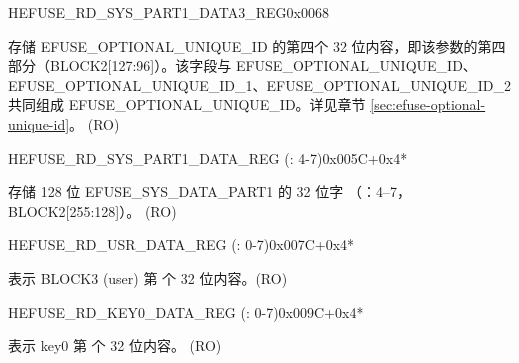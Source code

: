 \begin{register}{H}{EFUSE\_RD\_SYS\_PART1\_DATA3\_REG}{0x0068}\label{regdesc:EFUSERDSYSPART1DATA3REG}
%
\regnewline%
\begin{regdesc}\begin{reglist}
\label{fielddesc:EFUSEOPTIONALUNIQUEID3}\item [EFUSE\_OPTIONAL\_UNIQUE\_ID\_3] 存储 EFUSE\_OPTIONAL\_UNIQUE\_ID 的第四个 32 位内容，即该参数的第四部分（BLOCK2[127:96]）。该字段与 EFUSE\_OPTIONAL\_UNIQUE\_ID、EFUSE\_OPTIONAL\_UNIQUE\_ID\_1、EFUSE\_OPTIONAL\_UNIQUE\_ID\_2 共同组成 EFUSE\_OPTIONAL\_UNIQUE\_ID。详见章节 \ref{sec:efuse-optional-unique-id}。 (RO)
\end{reglist}\end{regdesc}
\end{register}


\begin{register}{H}{EFUSE\_RD\_SYS\_PART1\_DATA\_REG (: 4-7)}{0x005C+0x4*}\label{regdesc:EFUSERDSYSPART1DATA4TO7REG}
%
\regnewline%
\begin{regdesc}\begin{reglist}
\label{fielddesc:EFUSESYSDATAPART1N}\item [EFUSE\_SYS\_DATA\_PART1\_\regindex{n}] 存储 128 位 EFUSE\_SYS\_DATA\_PART1 的 32 位字 （：4–7，BLOCK2[255:128]）。 (RO)
\end{reglist}\end{regdesc}
\end{register}


\begin{register}{H}{EFUSE\_RD\_USR\_DATA\_REG (: 0-7)}{0x007C+0x4*}\label{regdesc:EFUSERDUSRDATANREG}
%
\regnewline%
\begin{regdesc}\begin{reglist}
\label{fielddesc:EFUSEUSRDATAN}\item [EFUSE\_USR\_DATA\regindex{n}] 表示 BLOCK3 (user) 第  个 32 位内容。(RO)
\end{reglist}\end{regdesc}
\end{register}


\begin{register}{H}{EFUSE\_RD\_KEY0\_DATA\_REG (: 0-7)}{0x009C+0x4*}\label{regdesc:EFUSERDKEY0DATANREG}
%
\regnewline%
\begin{regdesc}\begin{reglist}
\label{fielddesc:EFUSEKEY0DATAN}\item [EFUSE\_KEY0\_DATA\regindex{n}] 表示 key0 第  个 32 位内容。 (RO)
\end{reglist}\end{regdesc}
\end{register}


